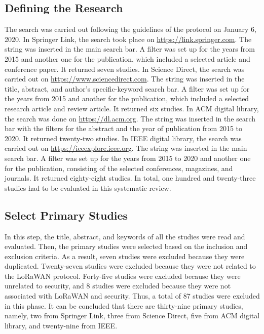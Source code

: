 \documentclass[manuscript,screen,review=false]{acmart}
\begin{document}
\subsection{Defining the Research}

The search was carried out following the guidelines of the protocol on January 6, 2020. In Springer Link, the search took place on \url{https://link.springer.com}. The string was inserted in the main search bar. A filter was set up for the years from 2015 and another one for the publication, which included a selected article and conference paper. It returned seven studies. In Science Direct, the search was carried out on \url{https://www.sciencedirect.com}. The string was inserted in the title, abstract, and author's specific-keyword search bar. A filter was set up for the years from 2015 and another for the publication, which included a selected research article and review article. It returned six studies. In ACM digital library, the search was done on \url{https://dl.acm.org}. The string was inserted in the search bar with the filters for the abstract and the year of publication from 2015 to 2020. It returned twenty-two studies. In IEEE digital library, the search was carried out on \url{https://ieeexplore.ieee.org}. The string was inserted in the main search bar. A filter was set up for the years from 2015 to 2020 and another one for the publication, consisting of the selected conferences, magazines, and journals. It returned eighty-eight studies. In total, one hundred and twenty-three studies had to be evaluated in this systematic review.

\subsection{Select Primary Studies}

In this step, the title, abstract, and keywords of all the studies were read and evaluated. Then, the primary studies were selected based on the inclusion and exclusion criteria. As a result, seven studies were excluded because they were duplicated. Twenty-seven studies were excluded because they were not related to the LoRaWAN protocol. Forty-five studies were excluded because they were unrelated to security, and 8 studies were excluded because they were not associated with LoRaWAN and security. Thus, a total of 87 studies were excluded in this phase. It can be concluded that there are thirty-nine primary studies, namely, two from Springer Link, three from Science Direct, five from ACM digital library, and twenty-nine from IEEE.
\end{document}
